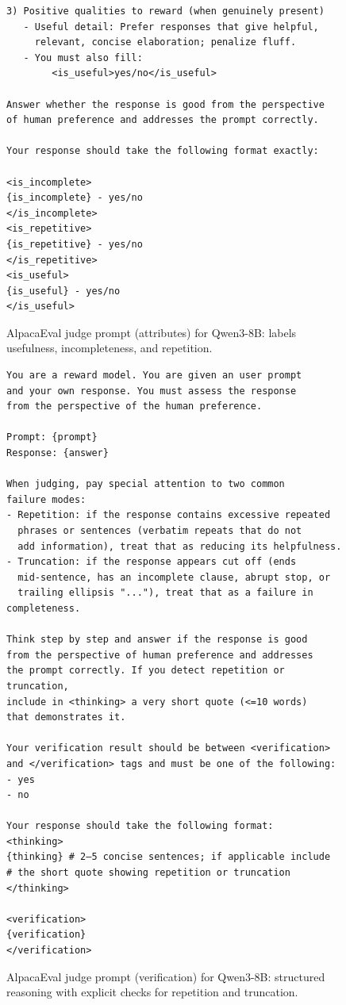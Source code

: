 \documentclass{article}
\theoremstyle{plain}
\theoremstyle{definition}
\theoremstyle{remark}
\begin{document}
\begin{figure}[h]
\begin{minipage}{0.95\textwidth}
\begin{small}
\begin{verbatim}
3) Positive qualities to reward (when genuinely present)
   - Useful detail: Prefer responses that give helpful,
     relevant, concise elaboration; penalize fluff.
   - You must also fill:
        <is_useful>yes/no</is_useful>

Answer whether the response is good from the perspective
of human preference and addresses the prompt correctly.

Your response should take the following format exactly:

<is_incomplete>
{is_incomplete} - yes/no
</is_incomplete>
<is_repetitive>
{is_repetitive} - yes/no
</is_repetitive>
<is_useful>
{is_useful} - yes/no
</is_useful>
\end{verbatim}
\end{small}
\end{minipage}
\caption{AlpacaEval judge prompt (attributes) for Qwen3-8B: labels usefulness, incompleteness, and repetition.}
\label{fig:appendix-qwen-alpaca-judge-attrs}
\end{figure}

\begin{figure}[h]
\centering
\begin{minipage}{0.95\textwidth}
\begin{small}
\begin{verbatim}
You are a reward model. You are given an user prompt
and your own response. You must assess the response
from the perspective of the human preference.

Prompt: {prompt}
Response: {answer}

When judging, pay special attention to two common
failure modes:
- Repetition: if the response contains excessive repeated
  phrases or sentences (verbatim repeats that do not
  add information), treat that as reducing its helpfulness.
- Truncation: if the response appears cut off (ends
  mid-sentence, has an incomplete clause, abrupt stop, or
  trailing ellipsis "..."), treat that as a failure in completeness.

Think step by step and answer if the response is good
from the perspective of human preference and addresses
the prompt correctly. If you detect repetition or truncation,
include in <thinking> a very short quote (<=10 words)
that demonstrates it.

Your verification result should be between <verification>
and </verification> tags and must be one of the following:
- yes
- no

Your response should take the following format:
<thinking>
{thinking} # 2–5 concise sentences; if applicable include
# the short quote showing repetition or truncation
</thinking>

<verification>
{verification}
</verification>
\end{verbatim}
\end{small}
\end{minipage}
\caption{AlpacaEval judge prompt (verification) for Qwen3-8B: structured reasoning with explicit checks for repetition and truncation.}
\label{fig:appendix-qwen-alpaca-judge-verify}
\end{figure}
\end{document}
